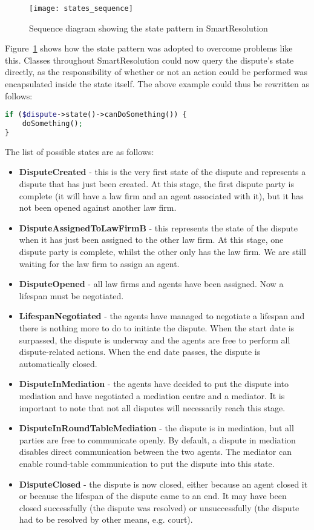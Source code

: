 \begin{figure}[h!]
  \centering
    \ifimages
    \texttt{[image: states\_sequence]}
    \fi
  \caption{Sequence diagram showing the state pattern in SmartResolution}
  \label{uml:states}
\end{figure}

Figure~\ref{uml:states} shows how the state pattern was adopted to overcome problems like this. Classes throughout SmartResolution could now query the dispute's state directly, as the responsibility of whether or not an action could be performed was encapsulated inside the state itself. The above example could thus be rewritten as follows:

\begin{lstlisting}[language=php]
if ($dispute->state()->canDoSomething()) {
    doSomething();
}
\end{lstlisting}

The list of possible states are as follows:

\begin{itemize}
    \item \textbf{DisputeCreated} - this is the very first state of the dispute and represents a dispute that has just been created. At this stage, the first dispute party is complete (it will have a law firm and an agent associated with it), but it has not been opened against another law firm.
    \item \textbf{DisputeAssignedToLawFirmB} - this represents the state of the dispute when it has just been assigned to the other law firm. At this stage, one dispute party is complete, whilst the other only has the law firm. We are still waiting for the law firm to assign an agent.
    \item \textbf{DisputeOpened} - all law firms and agents have been assigned. Now a lifespan must be negotiated.
    \item \textbf{LifespanNegotiated} - the agents have managed to negotiate a lifespan and there is nothing more to do to initiate the dispute. When the start date is surpassed, the dispute is underway and the agents are free to perform all dispute-related actions. When the end date passes, the dispute is automatically closed.
    \item \textbf{DisputeInMediation} - the agents have decided to put the dispute into mediation and have negotiated a mediation centre and a mediator. It is important to note that not all disputes will necessarily reach this stage.
    \item \textbf{DisputeInRoundTableMediation} - the dispute is in mediation, but all parties are free to communicate openly. By default, a dispute in mediation disables direct communication between the two agents. The mediator can enable round-table communication to put the dispute into this state.
    \item \textbf{DisputeClosed} - the dispute is now closed, either because an agent closed it or because the lifespan of the dispute came to an end. It may have been closed successfully (the dispute was resolved) or unsuccessfully (the dispute had to be resolved by other means, e.g. court).
\end{itemize}

